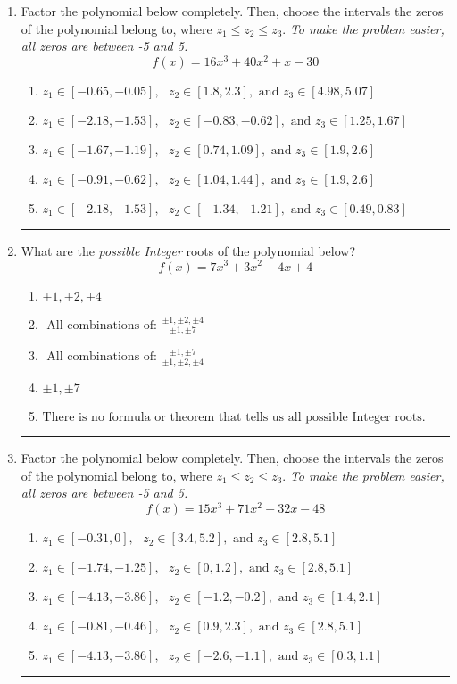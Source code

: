 \documentclass[14pt]{extbook}
\newcommand{\litem}[1]{\item#1\hspace*{-1cm}\rule{\textwidth}{0.4pt}}
\begin{document}
\begin{enumerate}
{\begin{enumerate}[label=\Alph*.]
\end{enumerate} }
\litem{
Factor the polynomial below completely. Then, choose the intervals the zeros of the polynomial belong to, where $z_1 \leq z_2 \leq z_3$. \textit{To make the problem easier, all zeros are between -5 and 5.}\[ f(x) = 16x^{3} +40 x^{2} +x -30 \]\begin{enumerate}[label=\Alph*.]
\item \( z_1 \in [-0.65, -0.05], \text{   }  z_2 \in [1.8, 2.3], \text{   and   } z_3 \in [4.98, 5.07] \)
\item \( z_1 \in [-2.18, -1.53], \text{   }  z_2 \in [-0.83, -0.62], \text{   and   } z_3 \in [1.25, 1.67] \)
\item \( z_1 \in [-1.67, -1.19], \text{   }  z_2 \in [0.74, 1.09], \text{   and   } z_3 \in [1.9, 2.6] \)
\item \( z_1 \in [-0.91, -0.62], \text{   }  z_2 \in [1.04, 1.44], \text{   and   } z_3 \in [1.9, 2.6] \)
\item \( z_1 \in [-2.18, -1.53], \text{   }  z_2 \in [-1.34, -1.21], \text{   and   } z_3 \in [0.49, 0.83] \)

\end{enumerate} }
\litem{
What are the \textit{possible Integer} roots of the polynomial below?\[ f(x) = 7x^{3} +3 x^{2} +4 x + 4 \]\begin{enumerate}[label=\Alph*.]
\item \( \pm 1,\pm 2,\pm 4 \)
\item \( \text{ All combinations of: }\frac{\pm 1,\pm 2,\pm 4}{\pm 1,\pm 7} \)
\item \( \text{ All combinations of: }\frac{\pm 1,\pm 7}{\pm 1,\pm 2,\pm 4} \)
\item \( \pm 1,\pm 7 \)
\item \( \text{There is no formula or theorem that tells us all possible Integer roots.} \)

\end{enumerate} }
\litem{
Factor the polynomial below completely. Then, choose the intervals the zeros of the polynomial belong to, where $z_1 \leq z_2 \leq z_3$. \textit{To make the problem easier, all zeros are between -5 and 5.}\[ f(x) = 15x^{3} +71 x^{2} +32 x -48 \]\begin{enumerate}[label=\Alph*.]
\item \( z_1 \in [-0.31, 0], \text{   }  z_2 \in [3.4, 5.2], \text{   and   } z_3 \in [2.8, 5.1] \)
\item \( z_1 \in [-1.74, -1.25], \text{   }  z_2 \in [0, 1.2], \text{   and   } z_3 \in [2.8, 5.1] \)
\item \( z_1 \in [-4.13, -3.86], \text{   }  z_2 \in [-1.2, -0.2], \text{   and   } z_3 \in [1.4, 2.1] \)
\item \( z_1 \in [-0.81, -0.46], \text{   }  z_2 \in [0.9, 2.3], \text{   and   } z_3 \in [2.8, 5.1] \)
\item \( z_1 \in [-4.13, -3.86], \text{   }  z_2 \in [-2.6, -1.1], \text{   and   } z_3 \in [0.3, 1.1] \)


\end{enumerate}}
\end{enumerate}
\end{document}
